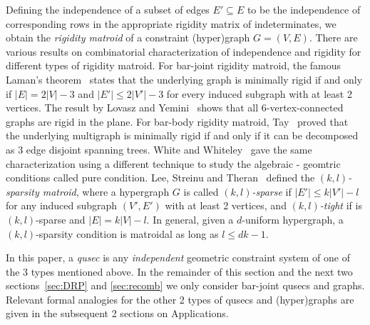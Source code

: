 Defining the independence of a subset of edges $E' \subseteq E$ 
to be the independence of corresponding rows in the appropriate rigidity matrix of indeterminates,
we obtain the {\em rigidity matroid} of a constraint (hyper)graph $G = (V,E)$. 
There are various results on combinatorial characterization of independence and rigidity
for different types of  rigidity matroid. 
For bar-joint rigidity matroid, 
the famous Laman's theorem~\cite{???} states that the underlying graph
is minimally rigid if and only if $|E| = 2|V|-3$ and $|E'| \le 2|V'|-3$ for every induced subgraph with at least 2 vertices. 
The result by Lovasz and Yemini~\cite{???} shows that all 6-vertex-connected graphs are rigid in the plane. 
For bar-body rigidity matroid,
Tay~\cite{???} proved that
the underlying multigraph is minimally rigid if and only if it can be decomposed as $3$ edge disjoint spanning trees. 
White and Whiteley~\cite{???} gave the same characterization using a different technique to study the algebraic - geomtric conditions called pure condition.
Lee, Streinu and Theran~\cite{???} defined the {\em $(k,l)$-sparsity matroid},
where a hypergraph $G$ is called {\em $(k,l)$-sparse} if $|E'| \le k|V'| - l$ for any induced subgraph $(V',E')$ with at least 2 vertices, 
and {\em $(k,l)$-tight} if is $(k,l)$-sparse and $|E| = k|V| - l$. 
In general, given a $d$-uniform hypergraph, a $(k,l)$-sparsity
condition is matroidal as long as $l \le dk-1$. 



In this paper, a {\em qusec} is any {\em independent} geometric 
constraint system of one of the 3 types mentioned above.
In the remainder of this section and the next two sections~\ref{sec:DRP} and \ref{sec:recomb} 
we only consider bar-joint qusecs and graphs. 
Relevant formal analogies  for the other 2 types of qusecs and (hyper)graphs 
are given in the subsequent 2 sections on Applications.





